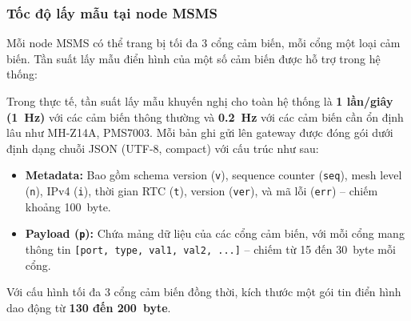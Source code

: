 \documentclass{article} %
\begin{document}
\subsubsection{Tốc độ lấy mẫu tại node MSMS}
Mỗi node MSMS có thể trang bị tối đa 3 cổng cảm biến, mỗi cổng một loại cảm biến. Tần suất lấy mẫu điển hình của một số cảm biến được hỗ trợ trong hệ thống:
\begin{table}[H]
    \centering
    \caption{Tần suất lấy mẫu và số trường dữ liệu của các cảm biến hỗ trợ}
    \label{tab:sensor_rate}
    \renewcommand{\arraystretch}{1.3}
\end{table}
Trong thực tế, tần suất lấy mẫu khuyến nghị cho toàn hệ thống là \textbf{1 lần/giây (1~Hz)} với các cảm biến thông thường và \textbf{0.2~Hz} với các cảm biến cần ổn định lâu như MH-Z14A, PMS7003. Mỗi bản ghi gửi lên gateway được đóng gói dưới định dạng chuỗi JSON (UTF-8, compact) với cấu trúc như sau:
\begin{itemize}
    \item \textbf{Metadata:} Bao gồm schema version (\texttt{v}), sequence counter (\texttt{seq}), mesh level (\texttt{n}), IPv4 (\texttt{i}), thời gian RTC (\texttt{t}), version (\texttt{ver}), và mã lỗi (\texttt{err}) -- chiếm khoảng 100~byte.
    \item \textbf{Payload (\texttt{p}):} Chứa mảng dữ liệu của các cổng cảm biến, với mỗi cổng mang thông tin \texttt{[port, type, val1, val2, ...]} -- chiếm từ 15 đến 30~byte mỗi cổng.
\end{itemize}
Với cấu hình tối đa 3 cổng cảm biến đồng thời, kích thước một gói tin điển hình dao động từ \textbf{130 đến 200~byte}.
\end{document}
